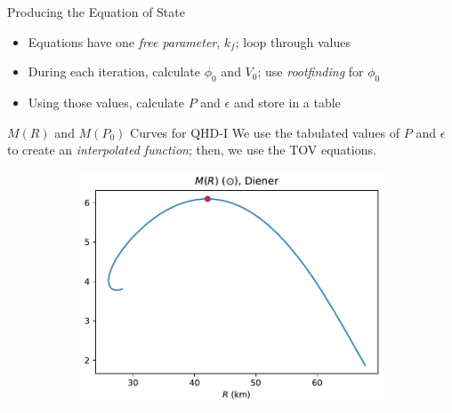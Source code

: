 \documentclass[handout]{beamer}
\begin{document}
    \begin{frame}{Producing the Equation of State}
        \begin{itemize}
            \item Equations have one \textit{free parameter}, $k_f$\pause ; loop through values\pause
            \item During each iteration, calculate $\phi_0$ and $V_0$\pause; use \textit{rootfinding} for $\phi_0$\pause
            \item Using those values, calculate $P$ and $\epsilon$ and store in a table
        \end{itemize}
    \end{frame}
    
    \begin{frame}{$M(R)$ and $M(P_0)$ Curves for QHD-I}
        We use the tabulated values of $P$ and $\epsilon$ to create an \textit{interpolated function}\pause ; then, we use the TOV equations. \pause
        \begin{figure}[h!]
            \centering
            \begin{subfigure}{.5\textwidth}
                \includegraphics[width = \textwidth]{../paper/images/qhd1/r_analysis.pdf}
            \end{subfigure}%
            \begin{subfigure}{.5\textwidth}

\end{subfigure}
\end{figure}
\end{frame}
\end{document}
